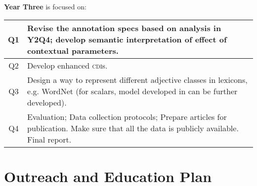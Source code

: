 \documentclass[10pt]{article}
\newcommand{\miniskip}{\vspace*{1mm}}
\begin{document}

\miniskip\noindent
{\bf Year Three} is focused on:  

\vspace{2mm}\noindent
{\small
\begin{tabularx}{470pt}{|c|X|}

\hline

Q1 & Revise the annotation specs based on analysis in Y2Q4; develop semantic interpretation of effect of contextual parameters. 
\\

\hline

Q2 & Develop enhanced \textsc{cdi}s.  \\

\hline

Q3 &   Design a way to represent different adjective classes in lexicons, e.g. WordNet (for scalars, model developed in \cite{sheinmanetal2013} can be further developed). \\

\hline

Q4 &  Evaluation; Data collection protocols; Prepare articles for publication. Make sure that all the data is publicly available. Final report.\\

\hline

\end{tabularx}
}



\vspace {-4mm}
\section{Outreach and Education Plan}

\vspace {-3mm}

\end{document}
